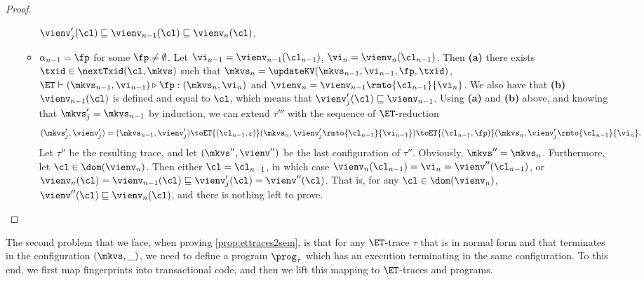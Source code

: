 \begin{proof}
\begin{itemize}
\begin{itemize}
$\vienv'_{j}(\cl) \sqsubseteq \vienv_{n-1}(\cl) \sqsubseteq \vienv_{n}(\cl)$, 
\item $\alpha_{n-1} = \fp$ for some $\fp \neq \emptyset$. 
Let $\vi_{n-1} = \vienv_{n-1}(\cl_{n-1})$, $\vi_{n} = \vienv_{n}(\cl_{n-1})$. Then \textbf{(a)} there exists $\txid \in \nextTxid(\cl, \mkvs)$ 
such that $\mkvs_{n} = \updateKV(\mkvs_{n-1}, \vi_{n-1}, \fp, \txid)$, $\ET \vdash (\mkvs_{n-1}, \vi_{n-1}) \triangleright \fp: (\mkvs_{n}, \vi_{n})$ 
and $\vienv_{n} = \vienv_{n-1}\rmto{\cl_{n-1}}{\vi_{n}}$. 
We also have that \textbf{(b)} $\vienv_{n-1}(\cl)$ is defined and equal to $\cl$, which means that $\vienv'_{j}(\cl) \sqsubseteq \vienv_{n-1}$. 
Using \textbf{(a)} and \textbf{(b)} above, and knowing that $\mkvs'_{j} = \mkvs_{n-1}$ by induction,   we can extend 
$\tau'''$ with the sequence of $\ET$-reduction 
\[ (\mkvs'_{j}, \vienv'_{j}) = (\mkvs_{n-1}, \vienv'_{j}) 
 \toET{(\cl_{n-1}, \varepsilon)} (\mkvs_{n}, \vienv'_{j}\rmto{\cl_{n-1}}{\vi_{n-1}}) \toET{(\cl_{n-1}, \fp)} (\mkvs_{n}, \vienv'_{j}\rmto{\cl_{n-1}}{\vi_{n}}.
 \]
Let $\tau''$ be the resulting trace, and let $(\mkvs'', \vienv'')$ be the last configuration of $\tau''$. 
Obviously, $\mkvs'' = \mkvs_{n}$. Furthermore, let $\cl \in \dom(\vienv_{n})$. Then either $\cl = \cl_{n-1}$, 
in which case $\vienv_{n}(\cl_{n-1}) = \vi_{n} = \vienv''(\cl_{n-1})$, or 
$\vienv_{n}(\cl) = \vienv_{n-1}(\cl) \sqsubseteq \vienv'_{j}(\cl) = \vienv''(\cl)$. That is, for any $\cl \in \dom(\vienv_{n})$, 
$\vienv''(\cl) \sqsubseteq \vienv_{n}(\cl)$, and there is nothing left to prove.
\end{itemize}

\end{itemize}

\end{proof}

The second problem that we face, when proving \cref{prop:ettraces2sem}, 
is that for any $\ET$-trace $\tau$ that is in normal form and 
that terminates in the configuration $(\mkvs, \_)$, we need to define a program 
$\prog_{\tau}$ which has an execution terminating in the same configuration. 
To this end, we first map fingerprints into transactional code, and then we lift 
this mapping to $\ET$-traces and programs. 


